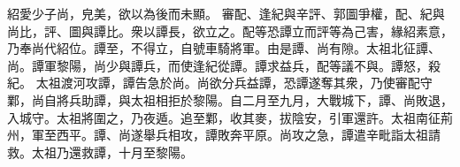 \begin{pinyinscope}
 
紹愛少子尚，皃美，欲以為後而未顯。
 審配、逢紀與辛評、郭圖爭權，配、紀與尚比，評、圖與譚比。衆以譚長，欲立之。配等恐譚立而評等為己害，緣紹素意，乃奉尚代紹位。譚至，不得立，自號車騎將軍。由是譚、尚有隙。太祖北征譚、尚。譚軍黎陽，尚少與譚兵，而使逢紀從譚。譚求益兵，配等議不與。譚怒，殺紀。
 太祖渡河攻譚，譚告急於尚。尚欲分兵益譚，恐譚遂奪其衆，乃使審配守鄴，尚自將兵助譚，與太祖相拒於黎陽。自二月至九月，大戰城下，譚、尚敗退，入城守。太祖將圍之，乃夜遁。追至鄴，收其麥，拔陰安，引軍還許。太祖南征荊州，軍至西平。譚、尚遂舉兵相攻，譚敗奔平原。尚攻之急，譚遣辛毗詣太祖請救。太祖乃還救譚，十月至黎陽。

\end{pinyinscope}
